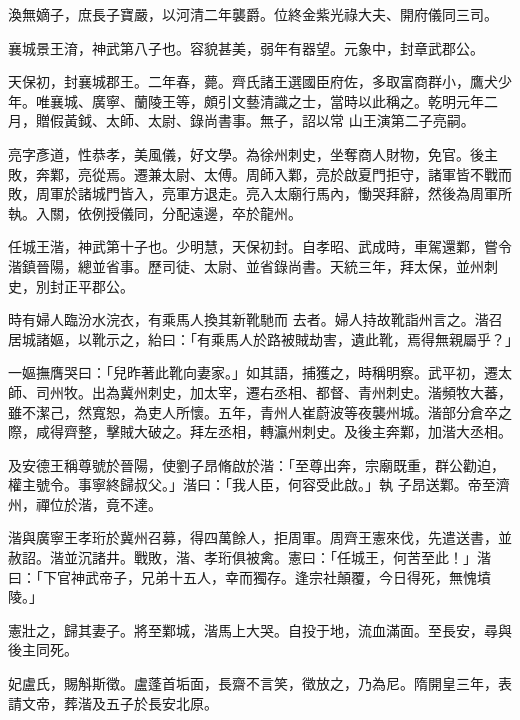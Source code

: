 \begin{pinyinscope}
 渙無嫡子，庶長子寶嚴，以河清二年襲爵。位終金紫光祿大夫、開府儀同三司。



 襄城景王淯，神武第八子也。容貌甚美，弱年有器望。元象中，封章武郡公。



 天保初，封襄城郡王。二年春，薨。齊氏諸王選國臣府佐，多取富商群小，鷹犬少年。唯襄城、廣寧、蘭陵王等，頗引文藝清識之士，當時以此稱之。乾明元年二月，贈假黃鉞、太師、太尉、錄尚書事。無子，詔以常
 山王演第二子亮嗣。



 亮字彥道，性恭孝，美風儀，好文學。為徐州刺史，坐奪商人財物，免官。後主敗，奔鄴，亮從焉。遷兼太尉、太傅。周師入鄴，亮於啟夏門拒守，諸軍皆不戰而敗，周軍於諸城門皆入，亮軍方退走。亮入太廟行馬內，慟哭拜辭，然後為周軍所執。入關，依例授儀同，分配遠邊，卒於龍州。



 任城王湝，神武第十子也。少明慧，天保初封。自孝昭、武成時，車駕還鄴，嘗令湝鎮晉陽，總並省事。歷司徒、太尉、並省錄尚書。天統三年，拜太保，並州刺史，別封正平郡公。



 時有婦人臨汾水浣衣，有乘馬人換其新靴馳而
 去者。婦人持故靴詣州言之。湝召居城諸嫗，以靴示之，紿曰：「有乘馬人於路被賊劫害，遺此靴，焉得無親屬乎？」



 一嫗撫膺哭曰：「兒昨著此靴向妻家。」如其語，捕獲之，時稱明察。武平初，遷太師、司州牧。出為冀州刺史，加太宰，遷右丞相、都督、青州刺史。湝頻牧大蕃，雖不潔己，然寬恕，為吏人所懷。五年，青州人崔蔚波等夜襲州城。湝部分倉卒之際，咸得齊整，擊賊大破之。拜左丞相，轉瀛州刺史。及後主奔鄴，加湝大丞相。



 及安德王稱尊號於晉陽，使劉子昂脩啟於湝：「至尊出奔，宗廟既重，群公勸迫，權主號令。事寧終歸叔父。」湝曰：「我人臣，何容受此啟。」執
 子昂送鄴。帝至濟州，禪位於湝，竟不達。



 湝與廣寧王孝珩於冀州召募，得四萬餘人，拒周軍。周齊王憲來伐，先遣送書，並赦詔。湝並沉諸井。戰敗，湝、孝珩俱被禽。憲曰：「任城王，何苦至此！」湝曰：「下官神武帝子，兄弟十五人，幸而獨存。逢宗社顛覆，今日得死，無愧墳陵。」



 憲壯之，歸其妻子。將至鄴城，湝馬上大哭。自投于地，流血滿面。至長安，尋與後主同死。



 妃盧氏，賜斛斯徵。盧蓬首垢面，長齋不言笑，徵放之，乃為尼。隋開皇三年，表請文帝，葬湝及五子於長安北原。




\end{pinyinscope}

